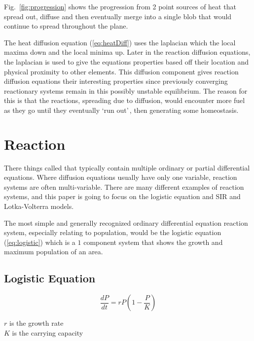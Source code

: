 \documentclass[12pt, letterpaper]{article}
\newcommand{\sorta}[1]{\lq #1\rq \,}
\begin{document}
Fig.~\ref{fig:progression} shows the progression from 2 point sources of heat that spread out, diffuse
and then eventually merge into a single blob that would continue to spread throughout the plane.

The heat diffusion equation (\ref{eq:heatDiff}) uses the laplacian which  the local maxima down 
and the local minima up. Later in the reaction diffusion equations, the laplacian is used to give the
equations properties based off their location and physical proximity to other elements. This diffusion
component gives reaction diffusion equations their interesting properties since previously converging
reactionary systems remain in this possibly unstable equilibrium. The reason for this is that the reactions,
spreading due to diffusion, would encounter more fuel as they go until they eventually \sorta{run out}, then
generating some homeostasis.

\section{Reaction} \label{reaction}
There things called  that typically contain multiple ordinary or partial differential 
equations. Where diffusion equations usually have only one variable, reaction systems are often 
multi-variable. There are many different examples of reaction systems, and this paper is going to focus on
the logistic equation and SIR and Lotka-Volterra models.

The most simple and generally recognized ordinary differential equation reaction system, especially relating
to population, would be the logistic equation (\ref{eq:logistic}) which is a $1$ component system that shows
the growth and maximum population of an area.

\subsection{Logistic Equation} \label{logistic}
\begin{singlespace}
  \begin{equation}\label{eq:logistic}
    \frac{dP}{dt} = rP (1 - \frac{P}{K})
  \end{equation}
  \begin{small}
$r$ is the growth rate \\
$K$ is the carrying capacity
  \end{small}
\end{singlespace}
\end{document}
